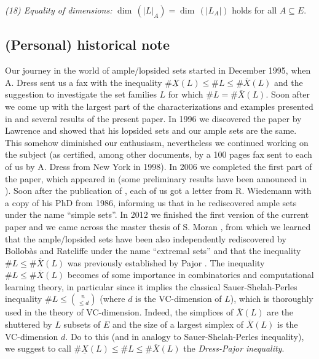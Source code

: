 \documentclass[11pt,a4paper]{amsart}
\theoremstyle{definition}
\numberwithin{equation}{section}
\newcommand{\covectors}{\ensuremath{L}}
\newcommand{\X}{\ensuremath{X}}
\begin{document}
\medskip\noindent
{\it {\rm(18)} Equality of  dimensions:}  $\dim \,(|{\covectors}|_A)=\dim \,(|{\covectors}_A|)$ holds for
  all $A\subseteq E$.




\subsection*{(Personal) historical note} Our journey in  the world of ample/lopsided sets started in December 1995, when A. Dress sent us a fax with the inequality $\#\underline{{\X}}({\covectors})\le \#{\covectors}\le \#\overline{{\X}}({\covectors})$ and the suggestion  to investigate the set families $\covectors$ for which $\#{\covectors}=\#\overline{{\X}}({\covectors})$. Soon after we come up with the largest part of the characterizations and examples presented in \cite{BaChDrKo} and several results of the present paper. In 1996 we discovered the paper by Lawrence \cite{La} and showed that his lopsided sets and our ample sets are the same. This somehow diminished our enthusiasm, nevertheless we continued working on the subject (as certified, among other documents, by a 100 pages fax sent to each of us by A. Dress from New York in 1998). In 2006 we completed the first part of the paper, which appeared in \cite{BaChDrKo} (some preliminary results have been announced in \cite{Dr}). Soon after the publication of \cite{BaChDrKo}, each of us got a letter from R. Wiedemann with a copy of his PhD \cite{Wi} from 1986, informing us that in \cite{Wi} he rediscovered ample sets
under the name ``simple sets''. In 2012 we finished the first version of the current paper and we came across the master
thesis of S. Moran \cite{Mo}, from which we learned that the ample/lopsided sets have been also independently rediscovered by Bollob\`as and Ratcliffe \cite{BoRa} under the name ``extremal sets'' and that the inequality $\#{\covectors}\le \#\overline{{\X}}({\covectors})$ was previously established by Pajor \cite{Pa}. The inequality
$\#{\covectors}\le \#\overline{{\X}}({\covectors})$ becomes of some importance in combinatorics and computational learning theory, in particular since it implies the classical Sauer-Shelah-Perles
inequality $\#L\le \binom{n}{\le d}$ (where $d$ is the VC-dimension of $L$), which is thoroughly used in the  theory of VC-dimension. Indeed,  the simplices of $\overline{{\X}}({\covectors})$  are  the shuttered by $\covectors$ subsets of $E$  and the size of a largest simplex of $\overline{{\X}}({\covectors})$ is the VC-dimension $d$.  Do to this (and in analogy to Sauer-Shelah-Perles
inequality), we suggest to call $\#\underline{{\X}}({\covectors})\le\#{\covectors}\le \#\overline{{\X}}({\covectors})$ the \emph{Dress-Pajor inequality}.
\end{document}
